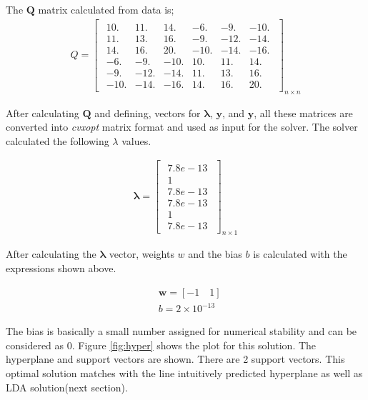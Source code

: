 \documentclass[11pt]{article}
\begin{document}
\newpage
The $\bm{Q}$ matrix calculated from data is;
\begin{align*}
    Q = 
    \begin{bmatrix}
        \begin{array}{rrrrrr}
            10.&  11.&  14.&  -6.&  -9.& -10.\\
             11.&  13.&  16.&  -9.& -12.& -14.\\
             14.&  16.&  20.& -10.& -14.& -16.\\
             -6.&  -9.& -10.&  10.&  11.&  14.\\
             -9.& -12.& -14.&  11.&  13.&  16.\\
            -10.& -14.& -16.&  14.&  16.&  20.
        \end{array}   
    \end{bmatrix}_{n\times n}
\end{align*}

After calculating $\bm{Q}$ and defining, vectors for $\bm{\lambda}$, $\bm{y}$, and $\bm{y}$, all these matrices are converted into \emph{cvxopt} matrix format and used as input for the solver. The solver calculated the following $\lambda$ values.

\begin{align*}
    \bm{\lambda} = 
    \begin{bmatrix}
        \begin{array}{c}
            7.8e-13\\
            1   \\
            7.8e-13 \\
            7.8e-13 \\
            1 \\
            7.8e-13
        \end{array}   
    \end{bmatrix}_{n\times 1}
\end{align*}

After calculating the $\bm{\lambda}$ vector, weights $w$ and the bias $b$ is calculated with the expressions shown above.

\begin{align*}
    &\bm{w} = [-1 \quad 1] \\
    &b = 2\times 10^{-13}
\end{align*}

The bias is basically a small number assigned for numerical stability and can be considered as 0. Figure \ref{fig:hyper} shows the plot for this solution. The hyperplane and support vectors are shown. There are 2 support vectors. This optimal solution matches with the line intuitively predicted hyperplane as well as LDA solution(next section).    
\end{document}
